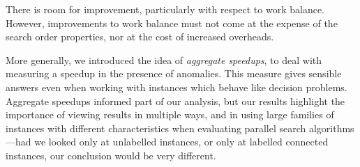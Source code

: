 \documentclass{llncs}
\begin{document}
There is room for improvement, particularly with respect to work balance. However, improvements to
work balance must not come at the expense of the search order properties, nor at the cost of
increased overheads.

More generally, we introduced the idea of \emph{aggregate speedups}, to deal with measuring a
speedup in the presence of anomalies. This measure gives sensible answers even when working with
instances which behave like decision problems. Aggregate speedups informed part of our analysis, but
our results highlight the importance of viewing results in multiple ways, and in using large
families of instances with different characteristics when evaluating parallel search
algorithms---had we looked only at unlabelled instances, or only at labelled connected instances,
our conclusion would be very different.



\end{document}
